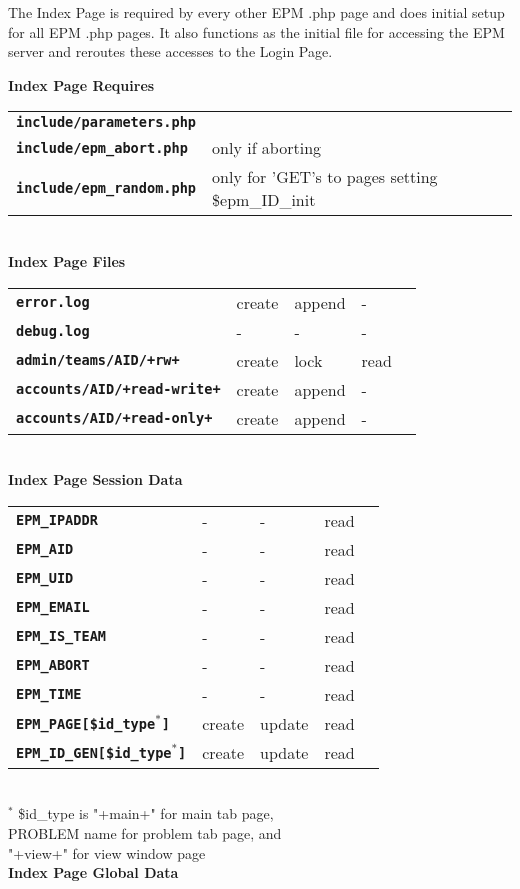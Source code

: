 \documentclass[12pt]{article}
\newcommand{\TT}[1]{{\tt \bfseries #1}}
\begin{document}
The Index Page is required by every other EPM .php page
and does initial setup for all EPM .php pages.  It also
functions as the initial file for accessing the EPM
server and reroutes these accesses to the Login Page.

\begin{center}
{\bf Index Page Requires}
\\[1ex]
\begin{tabular}{ll}
\TT{include/parameters.php} \\
\TT{include/epm\_abort.php} & only if aborting \\
\TT{include/epm\_random.php} & only for 'GET's to pages setting
                               \$epm\_ID\_init \\
\end{tabular}
\\[3ex]
{\bf Index Page Files}
\\[1ex]
\begin{tabular}{lllll}
\TT{error.log}			& create  & append & - \\
\TT{debug.log}			& -  & - & - \\
\TT{admin/teams/AID/+rw+}       & create  & lock   & read \\
\TT{accounts/AID/+read-write+}  & create  & append & - \\
\TT{accounts/AID/+read-only+}   & create  & append & - \\
\end{tabular}
\\[3ex]
{\bf Index Page Session Data}
\\[1ex]
\begin{tabular}{lllll}
\TT{EPM\_IPADDR}	& -  & -      & read \\
\TT{EPM\_AID}		& -  & -      & read \\
\TT{EPM\_UID}		& -  & -      & read \\
\TT{EPM\_EMAIL}		& -  & -      & read \\
\TT{EPM\_IS\_TEAM}	& -  & -      & read \\
\TT{EPM\_ABORT}		& -  & -      & read \\
\TT{EPM\_TIME}		& -  & -      & read \\
\TT{EPM\_PAGE[\$id\_type$^*$]}	& create  & update  & read \\
\TT{EPM\_ID\_GEN[\$id\_type$^*$]}	& create  & update  & read \\
\end{tabular}
\\[1ex]
$^*$ \$id\_type is "+main+" for main tab page,\\
PROBLEM name for problem tab page, and \\
"+view+" for view window page
\\[3ex]
{\bf Index Page Global Data}
\end{center}
\end{document}
